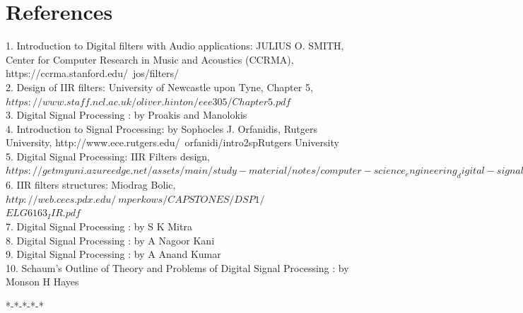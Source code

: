 \documentclass[journal,10pt,twocolumn]{article}
\begin{document}
\section{References}
\begin{flushleft}
    

\vspace{0.2cm}
1. Introduction to Digital filters with Audio applications: JULIUS O. SMITH, Center for Computer Research in Music and Acoustics (CCRMA), https://ccrma.stanford.edu/~jos/filters/ \\
\vspace{0.25cm}
2. Design of IIR filters: University of Newcastle upon Tyne, Chapter 5, $https://www.staff.ncl.ac.uk/oliver.hinton/eee305/Chapter5.pdf$\\
\vspace{0.25cm}
3. Digital Signal Processing : by Proakis and Manolokis\\
\vspace{0.25cm}
4. Introduction to Signal Processing: by Sophocles J. Orfanidis, Rutgers University, http://www.ece.rutgers.edu/~orfanidi/intro2spRutgers University\\
\vspace{0.25cm}
5. Digital Signal Processing: IIR Filters design, $https://getmyuni.azureedge.net/assets/main/study-material/notes/computer-science_engineering_digital-signal-processing_iir-filter-design_notes.pdf$\\
\vspace{0.20cm}
6. IIR filters structures: Miodrag Bolic,  $http://web.cecs.pdx.edu/~mperkows/CAPSTONES/DSP1/$ \\
$ELG6163_IIR.pdf$\\
\vspace{0.25cm}
7. Digital Signal Processing : by S K Mitra\\
\vspace{0.25cm}
8. Digital Signal Processing : by A Nagoor Kani\\
\vspace{0.25cm}
9. Digital Signal Processing : by A Anand Kumar\\
\vspace{0.25cm}
10. Schaum's Outline of Theory and Problems of Digital Signal Processing : by Monson H Hayes\\

\end{flushleft}
\begin{center}
*-*-*-*-*
\end{center}
\end{document}
